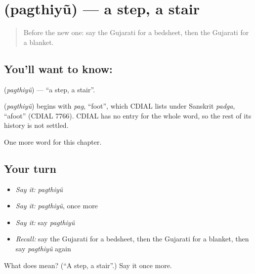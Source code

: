 \section[\texorpdfstring{\gu{પગથિયું} (pagthiyũ)}{પગથિયું (pagthiyũ)}]{ (pagthiyũ) — a step, a stair}

\label{lesson:GU-C107-pagthiyu}



\begin{quote}
Before the new one: say the Gujarati for a bedsheet, then the Gujarati for a blanket.
\end{quote}

\subsection*{You'll want to know: }
\textbf{} (\emph{pagthiyũ}) — \textquotedblleft{}a step, a stair\textquotedblright{}.

\begin{cousinweb}
\textbf{} (\emph{pagthiyũ}) begins with \emph{pag}, \textquotedblleft{}foot\textquotedblright{}, which CDIAL lists under Sanskrit \emph{padga}, \textquotedblleft{}afoot\textquotedblright{} (CDIAL 7766). CDIAL has no entry for the whole word, so the rest of its history is not settled.
\end{cousinweb}

\begin{grammarlens}[title={What you've built}]
One more word for this chapter.
\end{grammarlens}

\subsection*{Your turn}
\begin{itemize}
\raggedright
  \item \emph{Say it:} \emph{pagthiyũ}
  \item \emph{Say it:} \emph{pagthiyũ}, once more
  \item \emph{Say it:} say \emph{pagthiyũ}
  \item \emph{Recall:} say the Gujarati for a bedsheet, then the Gujarati for a blanket, then say \emph{pagthiyũ} again
\end{itemize}

\begin{tcolorbox}[breakable,colback=teal!4,colframe=teal!35!black,title={Before you move on}]
What does  mean? (\textquotedblleft{}A step, a stair\textquotedblright{}.) Say it once more.
\end{tcolorbox}

